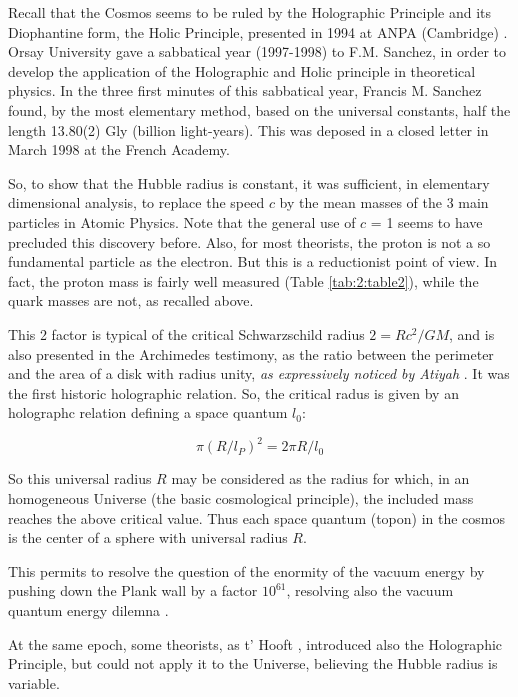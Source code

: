 \documentclass[a4paper,9pt]{article}
\begin{document}
Recall that the Cosmos seems to be ruled by the Holographic Principle and its Diophantine form, the Holic Principle, presented in 1994 at ANPA (Cambridge)  \cite{Sanchez1}. Orsay University gave a sabbatical year (1997-1998) to F.M. Sanchez, in order to develop the application of the Holographic and Holic principle in theoretical physics. In the three first minutes of this sabbatical year, Francis M. Sanchez found, by the most elementary method, based on the universal constants, half the length 13.80(2) Gly (billion light-years). This was deposed in a closed letter in March 1998 at the French Academy. 


So, to show that the Hubble radius is constant, it was sufficient, in elementary dimensional analysis, to replace the speed $c$ by the mean masses of the 3 main particles in Atomic Physics. Note that the general use of $c$ = 1 seems to have precluded this discovery before. Also, for most theorists, the proton is not a so fundamental particle as the electron. But this is a reductionist point of view. In fact, the proton mass is fairly well measured (Table \ref{tab:2:table2}), while the quark masses are not, as recalled above.
 
 
    This 2 factor is typical of the critical Schwarzschild radius $2 = Rc^2/GM$, and is also presented in the Archimedes testimony, as the ratio between the perimeter and the area of a disk with radius unity, \textit {as expressively noticed by Atiyah }. It was the first historic holographic relation. So, the critical radus is given by an holographc relation defining a space quantum $l_0$:
    
    \begin{equation}
        \pi (R/l_P)^2 = 2\pi R/l_0
    \end{equation}
    
    So this universal radius $R$ may be considered as the radius for which, in an homogeneous Universe (the basic cosmological principle), the included mass reaches the above critical value\cite{Sanchez}. Thus each space quantum (topon) in the cosmos is the center of a sphere with universal radius $R$.  
    
    
    This permits to resolve the question of the enormity of the vacuum energy by pushing down the Plank wall by a factor $10^61$, resolving also the vacuum quantum energy dilemna  \cite{Sanchez} . 
    
    
    At the same epoch, some theorists, as t' Hooft \cite{Hooft}, introduced also the Holographic Principle, but could not apply it to the Universe, believing the Hubble radius is variable.
    
\end{document}
